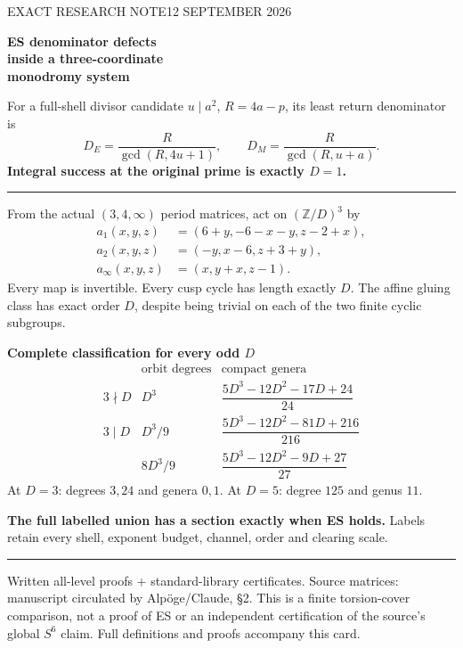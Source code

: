 \documentclass[11pt]{article}
\begin{document}
{\small\color{muted}EXACT RESEARCH NOTE\hfill 12 SEPTEMBER 2026\par}
\vspace{5pt}
{\LARGE\bfseries\color{navy}ES denominator defects\\inside a three-coordinate\\monodromy system\par}
\vspace{4pt}
For a full-shell divisor candidate $u\mid a^2$, $R=4a-p$, its least
return denominator is
\[
 D_E=\frac R{\gcd(R,4u+1)},\qquad D_M=\frac R{\gcd(R,u+a)}.
\]
\textbf{Integral success at the original prime is exactly $D=1$.}

\hrule\vspace{5pt}
From the actual $(3,4,\infty)$ period matrices, act on
$(\mathbb Z/D)^3$ by
\[
\begin{aligned}
a_1(x,y,z)&=(6+y,-6-x-y,z-2+x),\\
a_2(x,y,z)&=(-y,x-6,z+3+y),\\
a_\infty(x,y,z)&=(x,y+x,z-1).
\end{aligned}
\]
Every map is invertible. Every cusp cycle has length exactly $D$.
The affine gluing class has exact order $D$, despite being trivial
on each of the two finite cyclic subgroups.

{\large\bfseries\color{navy}Complete classification for every odd $D$}
\[
\begin{array}{c|c|c}
&\text{orbit degrees}&\text{compact genera}\\[3pt]\hline
3\nmid D&D^3&\dfrac{5D^3-12D^2-17D+24}{24}\\[12pt]
3\mid D&D^3/9&\dfrac{5D^3-12D^2-81D+216}{216}\\[12pt]
&8D^3/9&\dfrac{5D^3-12D^2-9D+27}{27}
\end{array}
\]
At $D=3$: degrees $3,24$ and genera $0,1$.
At $D=5$: degree $125$ and genus $11$.

\textbf{The full labelled union has a section exactly when ES holds.}
Labels retain every shell, exponent budget, channel, order and clearing scale.

\vfill\hrule\vspace{4pt}
{\footnotesize\color{muted}
Written all-level proofs + standard-library certificates. Source matrices:
manuscript circulated by Alp\"oge/Claude, \S2. This is a finite torsion-cover
comparison, not a proof of ES or an independent certification of the
source's global $S^6$ claim. Full definitions and proofs accompany this card.}
\end{document}
